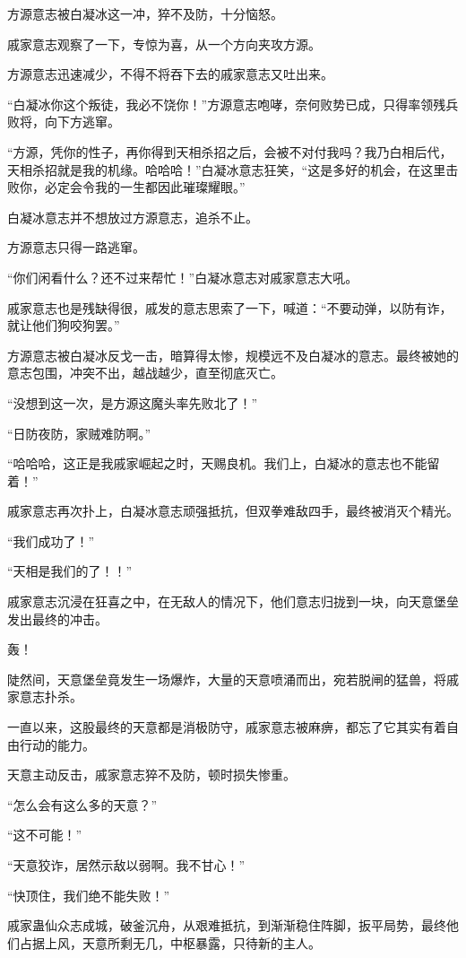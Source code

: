 \begin{this_body}
方源意志被白凝冰这一冲，猝不及防，十分恼怒。

戚家意志观察了一下，专惊为喜，从一个方向夹攻方源。

方源意志迅速减少，不得不将吞下去的戚家意志又吐出来。

“白凝冰你这个叛徒，我必不饶你！”方源意志咆哮，奈何败势已成，只得率领残兵败将，向下方逃窜。

“方源，凭你的性子，再你得到天相杀招之后，会被不对付我吗？我乃白相后代，天相杀招就是我的机缘。哈哈哈！”白凝冰意志狂笑，“这是多好的机会，在这里击败你，必定会令我的一生都因此璀璨耀眼。”

白凝冰意志并不想放过方源意志，追杀不止。

方源意志只得一路逃窜。

“你们闲看什么？还不过来帮忙！”白凝冰意志对戚家意志大吼。

戚家意志也是残缺得很，戚发的意志思索了一下，喊道：“不要动弹，以防有诈，就让他们狗咬狗罢。”

方源意志被白凝冰反戈一击，暗算得太惨，规模远不及白凝冰的意志。最终被她的意志包围，冲突不出，越战越少，直至彻底灭亡。

“没想到这一次，是方源这魔头率先败北了！”

“日防夜防，家贼难防啊。”

“哈哈哈，这正是我戚家崛起之时，天赐良机。我们上，白凝冰的意志也不能留着！”

戚家意志再次扑上，白凝冰意志顽强抵抗，但双拳难敌四手，最终被消灭个精光。

“我们成功了！”

“天相是我们的了！！”

戚家意志沉浸在狂喜之中，在无敌人的情况下，他们意志归拢到一块，向天意堡垒发出最终的冲击。

轰！

陡然间，天意堡垒竟发生一场爆炸，大量的天意喷涌而出，宛若脱闸的猛兽，将戚家意志扑杀。

一直以来，这股最终的天意都是消极防守，戚家意志被麻痹，都忘了它其实有着自由行动的能力。

天意主动反击，戚家意志猝不及防，顿时损失惨重。

“怎么会有这么多的天意？”

“这不可能！”

“天意狡诈，居然示敌以弱啊。我不甘心！”

“快顶住，我们绝不能失败！”

戚家蛊仙众志成城，破釜沉舟，从艰难抵抗，到渐渐稳住阵脚，扳平局势，最终他们占据上风，天意所剩无几，中枢暴露，只待新的主人。


\end{this_body}

